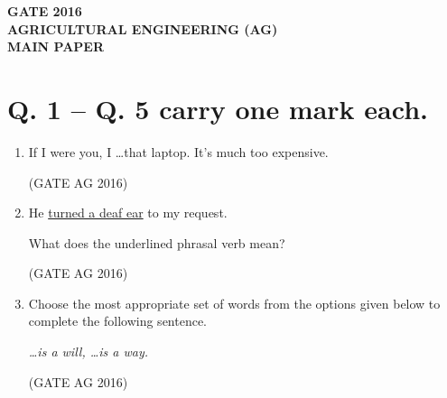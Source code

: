 \documentclass[journal]{IEEEtran}
\begin{document}
\begin{center}
    \textbf{\Large GATE 2016\\
    AGRICULTURAL ENGINEERING (AG)\\
    MAIN PAPER}
\end{center}


\section*{Q. 1 -- Q. 5 carry one mark each.}
\begin{enumerate}
\item 
If I were you, I \dots that laptop. It's much too expensive.

\begin{enumerate}
\end{enumerate}
\hfill(GATE AG 2016)\\

\medskip

\item 
He \underline{turned a deaf ear} to my request.

What does the underlined phrasal verb mean?

\begin{enumerate}
\end{enumerate}
\hfill(GATE AG 2016)\\

\medskip

\item 
Choose the most appropriate set of words from the options given below to complete the following sentence.

\emph{\dots is a will, \dots is a way.}

\begin{enumerate}
\end{enumerate}
\hfill(GATE AG 2016)\\


\end{enumerate}
\end{document}
